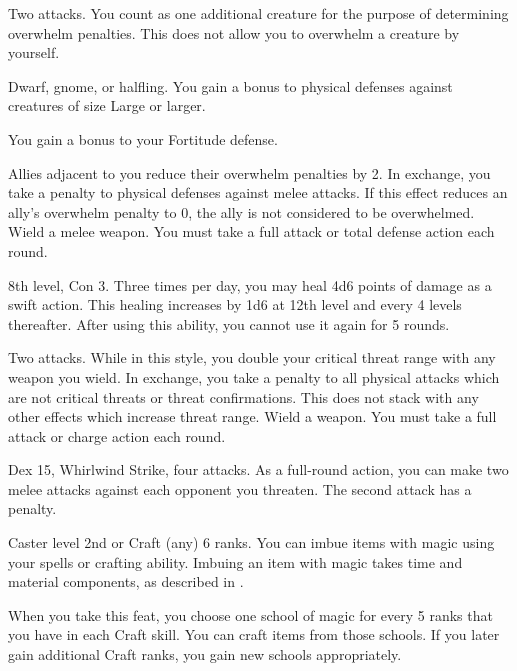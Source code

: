 \featpre Two attacks.
\featben You count as one additional creature for the purpose of determining overwhelm penalties.
This does not allow you to overwhelm a creature by yourself.

\featpre Dwarf, gnome, or halfling.
\featben You gain a  bonus to physical defenses against creatures of size Large or larger.

\featben You gain a  bonus to your Fortitude defense.

\featben Allies adjacent to you reduce their overwhelm penalties by 2.
In exchange, you take a  penalty to physical defenses against melee attacks.
If this effect reduces an ally's overwhelm penalty to 0, the ally is not considered to be overwhelmed.
\stylereq Wield a melee weapon.
You must take a full attack or total defense action each round.

\featpre 8th level, Con 3.
\featben Three times per day, you may heal 4d6 points of damage as a swift action.
This healing increases by 1d6 at 12th level and every 4 levels thereafter.
After using this ability, you cannot use it again for 5 rounds.

\featpre Two attacks.
\featben While in this style, you double your critical threat range with any weapon you wield.
In exchange, you take a  penalty to all physical attacks which are not critical threats or threat confirmations.
This does not stack with any other effects which increase threat range.
\stylereq Wield a weapon.
You must take a full attack or charge action each round.

\featpres Dex 15, Whirlwind Strike, four attacks.
\featben As a full-round action, you can make two melee attacks against each opponent you threaten.
The second attack has a  penalty.

\featpre Caster level 2nd or Craft (any) 6 ranks.
\featben You can imbue items with magic using your spells or crafting ability.
Imbuing an item with magic takes time and material components, as described in .

When you take this feat, you choose one school of magic for every 5 ranks that you have in each Craft skill.
You can craft items from those schools.
If you later gain additional Craft ranks, you gain new schools appropriately.

